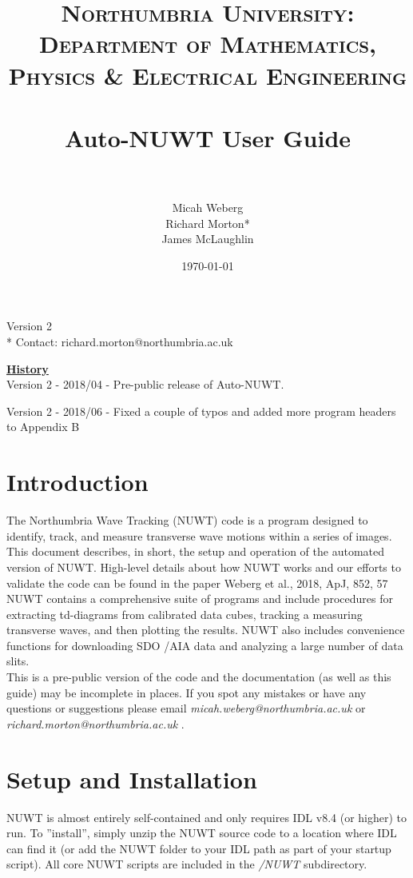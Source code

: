 \documentclass{article}
\title{	
\normalfont \normalsize 
\textsc{Northumbria University: Department of Mathematics, Physics \& Electrical Engineering} \\ [25pt] %
\horrule{0.5pt} \\[0.4cm] %
\huge Auto-NUWT User Guide \\ %
\horrule{2pt} \\[0.5cm] %
}
\author{Micah Weberg \\ Richard Morton* \\ James McLaughlin} %
\date{\normalsize\today} %
\begin{document}
\maketitle %

\vspace{10cm}

\begin{center}
{Version 2}\\
* Contact: richard.morton@northumbria.ac.uk 
\end{center}

\newpage

\tableofcontents

\newpage
\underline{\textbf{History}}\\

Version 2 - 2018/04 - Pre-public release of Auto-NUWT.

Version 2 - 2018/06 - Fixed a couple of typos and added more program headers to Appendix B 

\newpage


\section{Introduction}
The Northumbria Wave Tracking (NUWT) code is a program designed to identify, track, and measure transverse wave motions within a series of images. This document describes, in short, the setup and operation of the automated version of NUWT. High-level details about how NUWT works and our efforts to validate the code can be found in the paper Weberg et al., 2018, ApJ, 852, 57 \\

NUWT contains a comprehensive suite of programs and include procedures for extracting td-diagrams from calibrated data cubes, tracking a measuring transverse waves, and then plotting the results. NUWT also includes convenience functions for downloading SDO /AIA data and analyzing a large number of data slits. \\

This is a pre-public version of the code and the documentation (as well as this guide) may be incomplete in places. If you spot any mistakes or have any questions or suggestions please email \textit{micah.weberg@northumbria.ac.uk} or \textit{richard.morton@northumbria.ac.uk} .


\section{Setup and Installation}
NUWT is almost entirely self-contained and only requires IDL v8.4 (or higher) to run. To ''install'', simply unzip the NUWT source code to a location where IDL can find it (or add the NUWT folder to your IDL path as part of your startup script). All core NUWT scripts are included in the \textit{/NUWT} subdirectory. \\
\end{document}
